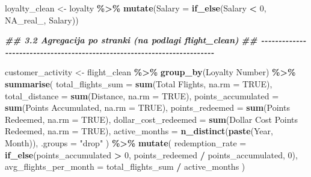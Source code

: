 \documentclass[
]{article}
\newenvironment{Shaded}{\begin{snugshade}}{\end{snugshade}}
\newcommand{\AttributeTok}[1]{\textcolor[rgb]{0.13,0.29,0.53}{#1}}
\newcommand{\ConstantTok}[1]{\textcolor[rgb]{0.56,0.35,0.01}{#1}}
\newcommand{\DecValTok}[1]{\textcolor[rgb]{0.00,0.00,0.81}{#1}}
\newcommand{\DocumentationTok}[1]{\textcolor[rgb]{0.56,0.35,0.01}{\textbf{\textit{#1}}}}
\newcommand{\FunctionTok}[1]{\textcolor[rgb]{0.13,0.29,0.53}{\textbf{#1}}}
\newcommand{\NormalTok}[1]{#1}
\newcommand{\OtherTok}[1]{\textcolor[rgb]{0.56,0.35,0.01}{#1}}
\newcommand{\SpecialCharTok}[1]{\textcolor[rgb]{0.81,0.36,0.00}{\textbf{#1}}}
\newcommand{\StringTok}[1]{\textcolor[rgb]{0.31,0.60,0.02}{#1}}
\begin{document}
\begin{Shaded}
\begin{Highlighting}[]
\NormalTok{loyalty\_clean }\OtherTok{\textless{}{-}}\NormalTok{ loyalty }\SpecialCharTok{\%\textgreater{}\%}
  \FunctionTok{mutate}\NormalTok{(}\AttributeTok{Salary =} \FunctionTok{if\_else}\NormalTok{(Salary }\SpecialCharTok{\textless{}} \DecValTok{0}\NormalTok{, }\ConstantTok{NA\_real\_}\NormalTok{, Salary))}

\DocumentationTok{\#\# 3.2 Agregacija po stranki (na podlagi flight\_clean)}
\DocumentationTok{\#\# {-}{-}{-}{-}{-}{-}{-}{-}{-}{-}{-}{-}{-}{-}{-}{-}{-}{-}{-}{-}{-}{-}{-}{-}{-}{-}{-}{-}{-}{-}{-}{-}{-}{-}{-}{-}{-}{-}{-}{-}{-}{-}{-}{-}{-}{-}{-}{-}{-}{-}{-}{-}{-}{-}{-}{-}{-}{-}{-}{-}{-}{-}{-}{-}{-}{-}{-}{-}{-}{-}{-}{-}{-}}

\NormalTok{customer\_activity }\OtherTok{\textless{}{-}}\NormalTok{ flight\_clean }\SpecialCharTok{\%\textgreater{}\%}
  \FunctionTok{group\_by}\NormalTok{(}\StringTok{\textasciigrave{}}\AttributeTok{Loyalty Number}\StringTok{\textasciigrave{}}\NormalTok{) }\SpecialCharTok{\%\textgreater{}\%}
  \FunctionTok{summarise}\NormalTok{(}
    \AttributeTok{total\_flights\_sum    =} \FunctionTok{sum}\NormalTok{(}\StringTok{\textasciigrave{}}\AttributeTok{Total Flights}\StringTok{\textasciigrave{}}\NormalTok{, }\AttributeTok{na.rm =} \ConstantTok{TRUE}\NormalTok{),}
    \AttributeTok{total\_distance       =} \FunctionTok{sum}\NormalTok{(Distance, }\AttributeTok{na.rm =} \ConstantTok{TRUE}\NormalTok{),}
    \AttributeTok{points\_accumulated   =} \FunctionTok{sum}\NormalTok{(}\StringTok{\textasciigrave{}}\AttributeTok{Points Accumulated}\StringTok{\textasciigrave{}}\NormalTok{, }\AttributeTok{na.rm =} \ConstantTok{TRUE}\NormalTok{),}
    \AttributeTok{points\_redeemed      =} \FunctionTok{sum}\NormalTok{(}\StringTok{\textasciigrave{}}\AttributeTok{Points Redeemed}\StringTok{\textasciigrave{}}\NormalTok{, }\AttributeTok{na.rm =} \ConstantTok{TRUE}\NormalTok{),}
    \AttributeTok{dollar\_cost\_redeemed =} \FunctionTok{sum}\NormalTok{(}\StringTok{\textasciigrave{}}\AttributeTok{Dollar Cost Points Redeemed}\StringTok{\textasciigrave{}}\NormalTok{, }\AttributeTok{na.rm =} \ConstantTok{TRUE}\NormalTok{),}
    \AttributeTok{active\_months        =} \FunctionTok{n\_distinct}\NormalTok{(}\FunctionTok{paste}\NormalTok{(Year, Month)),}
    \AttributeTok{.groups =} \StringTok{"drop"}
\NormalTok{  ) }\SpecialCharTok{\%\textgreater{}\%}
  \FunctionTok{mutate}\NormalTok{(}
    \AttributeTok{redemption\_rate       =} \FunctionTok{if\_else}\NormalTok{(points\_accumulated }\SpecialCharTok{\textgreater{}} \DecValTok{0}\NormalTok{,}
\NormalTok{                                     points\_redeemed }\SpecialCharTok{/}\NormalTok{ points\_accumulated, }\DecValTok{0}\NormalTok{),}
    \AttributeTok{avg\_flights\_per\_month =}\NormalTok{ total\_flights\_sum }\SpecialCharTok{/}\NormalTok{ active\_months}
\NormalTok{  )}


\end{Highlighting}
\end{Shaded}
\end{document}
